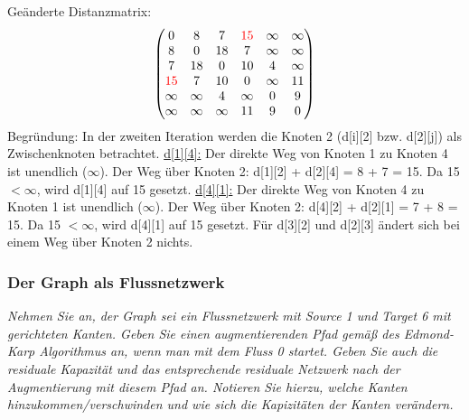 \documentclass{article}
\begin{document}
Geänderte Distanzmatrix: 
\[
\begin{pmatrix}
    0 & 8 & 7 & \textcolor{red}{15}  & \infty & \infty \\
    8 & 0 & 18 & 7 & \infty & \infty \\
    7 & 18 & 0 & 10 & 4 & \infty \\ 
    \textcolor{red}{15} & 7 & 10 & 0 & \infty & 11 \\
    \infty & \infty & 4 & \infty & 0 & 9 \\
    \infty & \infty & \infty & 11 & 9 & 0
\end{pmatrix}
\]
\noindent
Begründung: \newline
In der zweiten Iteration werden die Knoten 2 (d[i][2] bzw. d[2][j]) als Zwischenknoten betrachtet.  \newline \newline
\underline{d[1][4]:} \newline
Der direkte Weg von Knoten 1 zu Knoten 4 ist unendlich ($\infty$).  \newline
Der Weg über Knoten 2: d[1][2] + d[2][4] = 8 + 7 = 15. \newline
Da 15 $< \infty$, wird d[1][4] auf 15 gesetzt. \newline \newline
\noindent
\underline{d[4][1]:} \newline
Der direkte Weg von Knoten 4 zu Knoten 1 ist unendlich ($\infty$).  \newline
Der Weg über Knoten 2: d[4][2] + d[2][1] = 7 + 8 = 15. \newline
Da 15 $< \infty$, wird d[4][1] auf 15 gesetzt. \newline \newline
\noindent
Für d[3][2] und d[2][3] ändert sich bei einem Weg über Knoten 2 nichts. 


\subsubsection{Der Graph als Flussnetzwerk}
\textit{Nehmen Sie an, der Graph sei ein Flussnetzwerk mit Source 1 und Target 6 mit gerichteten Kanten. Geben Sie einen augmentierenden Pfad  gemäß des Edmond-Karp Algorithmus an, wenn man mit dem Fluss 0 startet. Geben Sie auch die residuale Kapazität  und das entsprechende residuale Netzwerk  nach der Augmentierung mit diesem Pfad an. Notieren Sie hierzu, welche Kanten hinzukommen/verschwinden und wie sich die Kapizitäten der Kanten verändern. } \cite{probeklausur21}
\end{document}
